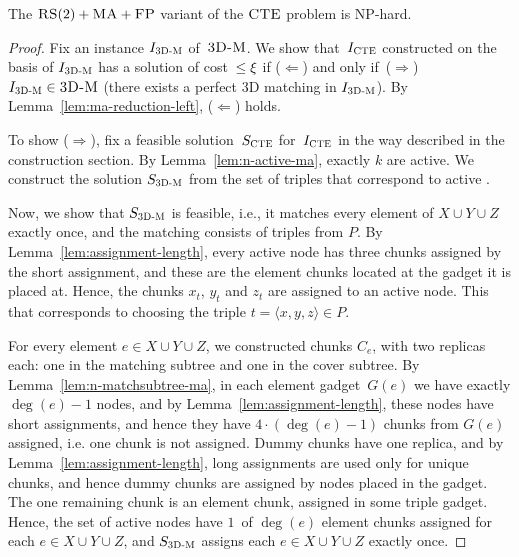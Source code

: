 \begin{theorem}
  The $\textsc{RS}(2)+\textsc{MA}+\textsc{FP}$ variant of the $\textsc{CTE}$ problem is NP-hard.
  \label{th:ma-reduction}
\end{theorem}

\begin{proof}
  
  Fix an instance $I_{\mathrm{\textsc{3D-M}}}$ of~$\textsc{3D-M}$.
  We show that~$I_{\mathrm{\textsc{CTE}}}$ constructed on the basis of $I_{\mathrm{\textsc{3D-M}}}$ has a solution of cost~$\leq \xi$ if ($\Leftarrow$) and only if~($\Rightarrow$) $I_{\mathrm{\textsc{3D-M}}} \in \textsc{3D-M}$ (there exists a perfect 3D matching in $I_{\mathrm{\textsc{3D-M}}}$).
  By Lemma~\ref{lem:ma-reduction-left}, ($\Leftarrow$) holds.

  To show ($\Rightarrow$), fix a feasible solution~$S_{\mathrm{\textsc{CTE}}}$ for~$I_{\mathrm{\textsc{CTE}}}$ in the way described in the construction section.
  By Lemma~\ref{lem:n-active-ma}, exactly $k$ \TripleGadgets{} are active.
  We construct the solution $S_{\mathrm{\textsc{3D-M}}}$ from the set of triples that correspond to active \TripleGadgets{}.

  Now, we show that $S_{\mathrm{\textsc{3D-M}}}$ is feasible, i.e., it matches every element of $X\cup Y\cup Z$ exactly once, and the matching consists of triples from $P$.
  By Lemma~\ref{lem:assignment-length}, every active node has three chunks assigned by the short assignment, and these are the element chunks located at the gadget it is placed at.
  Hence, the chunks $x_t$, $y_t$ and $z_t$ are assigned to an active node. This that corresponds to choosing the triple $t = \langle x, y, z \rangle \in P$.
  
  For every element $e\in X\cup Y \cup Z$, we constructed chunks $C_e$, with two replicas each: one in the matching subtree and one in the cover subtree.
  By Lemma~\ref{lem:n-matchsubtree-ma}, in each element gadget~$G(e)$ we have exactly $\deg(e) - 1$ nodes, and by Lemma~\ref{lem:assignment-length}, these nodes have short assignments, and hence they have $4 \cdot (\deg(e) - 1)$ chunks from $G(e)$ assigned, i.e. one chunk is not assigned.
  Dummy chunks have one replica, and by Lemma~\ref{lem:assignment-length}, long assignments are used only for unique chunks, and hence dummy chunks are assigned by nodes placed in the gadget.
   The one remaining chunk is an element chunk, assigned in some triple gadget.
  Hence, the set of active nodes have $1$~of $\deg(e)$ element chunks assigned for each $e\in X\cup Y\cup Z$, and $S_{\mathrm{\textsc{3D-M}}}$ assigns each $e\in X\cup Y\cup Z$ exactly once.
 

\end{proof}
